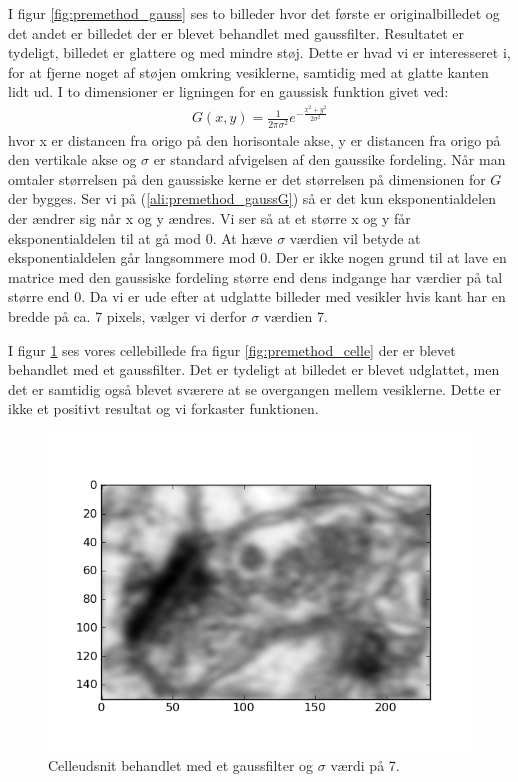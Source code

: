 I figur \ref{fig:premethod_gauss} ses to billeder hvor det første er originalbilledet og det andet er billedet der er blevet behandlet med gaussfilter. Resultatet er tydeligt, billedet er glattere og med mindre støj. Dette er hvad vi er interesseret i, for at fjerne noget af støjen omkring vesiklerne, samtidig med at glatte kanten lidt ud. I to dimensioner er ligningen for en gaussisk funktion givet ved: 
\begin{align}
	G(x,y) = \frac{1}{2\pi\sigma^2}e^{-\frac{x^2+y^2}{2\sigma^2}}\label{ali:premethod_gaussG}
\end{align}
hvor x er distancen fra origo på den horisontale akse, y er distancen fra origo på den vertikale akse og $\sigma$ er standard afvigelsen af den gaussike fordeling. Når man omtaler størrelsen på den gaussiske kerne er det størrelsen på dimensionen for $G$ der bygges. Ser vi på (\ref{ali:premethod_gaussG}) så er det kun eksponentialdelen der ændrer sig når x og y ændres. Vi ser så at et større x og y får eksponentialdelen til at gå mod 0. At hæve $\sigma$ værdien vil betyde at eksponentialdelen går langsommere mod 0. Der er ikke nogen grund til at lave en matrice med den gaussiske fordeling større end dens indgange har værdier på tal større end 0. Da vi er ude efter at udglatte billeder med vesikler hvis kant har en bredde på ca. 7 pixels, vælger vi derfor $\sigma$ værdien 7.

I figur \ref{fig:premethod_GaussCelle} ses vores cellebillede fra figur \ref{fig:premethod_celle} der er blevet behandlet med et gaussfilter. Det er tydeligt at billedet er blevet udglattet, men det er samtidig også blevet sværere at se overgangen mellem vesiklerne. Dette er ikke et positivt resultat og vi forkaster funktionen.

\begin{figure}[H]
	\centering
	\includegraphics[scale=0.8]{files/premethod/img/gausscell.png}
	\caption{Celleudsnit behandlet med et gaussfilter og $\sigma$ værdi på 7.\label{fig:premethod_GaussCelle}}
\end{figure}

